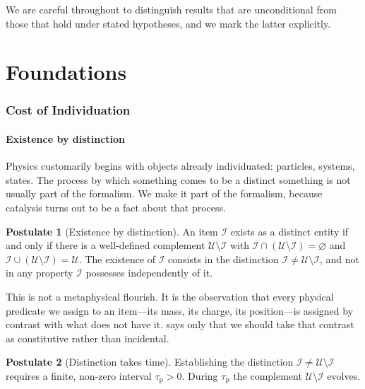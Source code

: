 \documentclass[11pt,twocolumn,a4paper]{article}
\theoremstyle{plain}
\theoremstyle{definition}
\newtheorem{postulate}{Postulate}
\theoremstyle{remark}
\newcommand{\Univ}{\mathcal{U}}
\newcommand{\Item}{\mathcal{I}}
\newcommand{\taup}{\tau_{\mathrm{p}}}
\begin{document}
We are careful throughout to distinguish results that are unconditional from
those that hold under stated hypotheses, and we mark the latter explicitly.

\part{Foundations}

\section{Cost of Individuation}
\label{sec:individuation}

\subsection{Existence by distinction}

Physics customarily begins with objects already individuated: particles,
systems, states. The process by which something comes to be a distinct
something is not usually part of the formalism. We make it part of the
formalism, because catalysis turns out to be a fact about that process.

\begin{postulate}[Existence by distinction]
\label{post:negation}
An item $\Item$ exists as a distinct entity if and only if there is a
well-defined complement $\Univ \setminus \Item$ with
$\Item \cap (\Univ\setminus\Item) = \varnothing$ and
$\Item \cup (\Univ\setminus\Item) = \Univ$. The existence of $\Item$ consists in
the distinction $\Item \neq \Univ\setminus\Item$, and not in any property
$\Item$ possesses independently of it.
\end{postulate}

This is not a metaphysical flourish. It is the observation that every physical
predicate we assign to an item---its mass, its charge, its position---is
assigned by contrast with what does not have it.  says only
that we should take that contrast as constitutive rather than incidental.

\begin{postulate}[Distinction takes time]
\label{post:duration}
Establishing the distinction $\Item \neq \Univ\setminus\Item$ requires a finite,
non-zero interval $\taup > 0$. During $\taup$ the complement
$\Univ\setminus\Item$ evolves.
\end{postulate}
\end{document}
